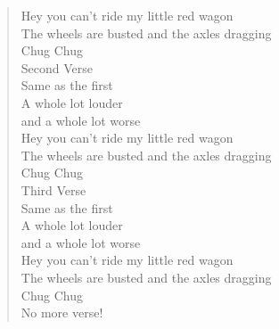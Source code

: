 
\begin{verse}
Hey you can't ride my little red wagon \\

The wheels are busted and the axles dragging \\

Chug Chug \\
Second Verse \\
Same as the first \\
A whole lot louder \\
and a whole lot worse \\

Hey you can't ride my little red wagon \\

The wheels are busted and the axles dragging \\

Chug Chug \\
Third Verse \\
Same as the first \\
A whole lot louder \\
and a whole lot worse \\

Hey you can't ride my little red wagon \\
The wheels are busted and the axles dragging \\
Chug Chug \\
No more verse! \\
\end{verse}
